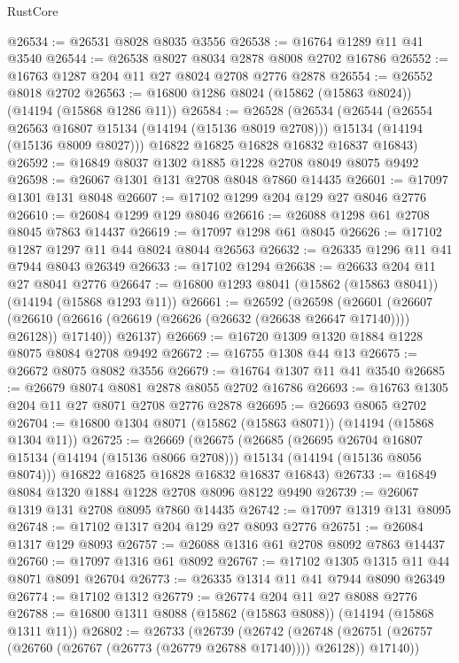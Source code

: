 \begin{lexlean}{RustCore}
\begin{coremodule}
@26534 := @26531 @8028 @8035 @3556
@26538 := @16764 @1289 @11 @41 @3540
@26544 := @26538 @8027 @8034 @2878 @8008 @2702 @16786
@26552 := @16763 @1287 @204 @11 @27 @8024 @2708 @2776 @2878
@26554 := @26552 @8018 @2702
@26563 := @16800 @1286 @8024 (@15862 (@15863 @8024)) (@14194 (@15868 @1286 @11))
@26584 := @26528
    (@26534
      (@26544
        (@26554 @26563 @16807 @15134 (@14194 (@15136 @8019 @2708)))
        @15134
        (@14194 (@15136 @8009 @8027)))
      @16822
      @16825
      @16828
      @16832
      @16837
      @16843)
@26592 := @16849 @8037 @1302 @1885 @1228 @2708 @8049 @8075 @9492
@26598 := @26067 @1301 @131 @2708 @8048 @7860 @14435
@26601 := @17097 @1301 @131 @8048
@26607 := @17102 @1299 @204 @129 @27 @8046 @2776
@26610 := @26084 @1299 @129 @8046
@26616 := @26088 @1298 @61 @2708 @8045 @7863 @14437
@26619 := @17097 @1298 @61 @8045
@26626 := @17102 @1287 @1297 @11 @44 @8024 @8044 @26563
@26632 := @26335 @1296 @11 @41 @7944 @8043 @26349
@26633 := @17102 @1294
@26638 := @26633 @204 @11 @27 @8041 @2776
@26647 := @16800 @1293 @8041 (@15862 (@15863 @8041)) (@14194 (@15868 @1293 @11))
@26661 := @26592
    (@26598
      (@26601
        (@26607 (@26610 (@26616 (@26619 (@26626 (@26632 (@26638 @26647 @17140)))) @26128)) @17140))
      @26137)
@26669 := @16720 @1309 @1320 @1884 @1228 @8075 @8084 @2708 @9492
@26672 := @16755 @1308 @44 @13
@26675 := @26672 @8075 @8082 @3556
@26679 := @16764 @1307 @11 @41 @3540
@26685 := @26679 @8074 @8081 @2878 @8055 @2702 @16786
@26693 := @16763 @1305 @204 @11 @27 @8071 @2708 @2776 @2878
@26695 := @26693 @8065 @2702
@26704 := @16800 @1304 @8071 (@15862 (@15863 @8071)) (@14194 (@15868 @1304 @11))
@26725 := @26669
    (@26675
      (@26685
        (@26695 @26704 @16807 @15134 (@14194 (@15136 @8066 @2708)))
        @15134
        (@14194 (@15136 @8056 @8074)))
      @16822
      @16825
      @16828
      @16832
      @16837
      @16843)
@26733 := @16849 @8084 @1320 @1884 @1228 @2708 @8096 @8122 @9490
@26739 := @26067 @1319 @131 @2708 @8095 @7860 @14435
@26742 := @17097 @1319 @131 @8095
@26748 := @17102 @1317 @204 @129 @27 @8093 @2776
@26751 := @26084 @1317 @129 @8093
@26757 := @26088 @1316 @61 @2708 @8092 @7863 @14437
@26760 := @17097 @1316 @61 @8092
@26767 := @17102 @1305 @1315 @11 @44 @8071 @8091 @26704
@26773 := @26335 @1314 @11 @41 @7944 @8090 @26349
@26774 := @17102 @1312
@26779 := @26774 @204 @11 @27 @8088 @2776
@26788 := @16800 @1311 @8088 (@15862 (@15863 @8088)) (@14194 (@15868 @1311 @11))
@26802 := @26733
    (@26739
      (@26742
        (@26748 (@26751 (@26757 (@26760 (@26767 (@26773 (@26779 @26788 @17140)))) @26128)) @17140))

\end{coremodule}
\end{lexlean}
